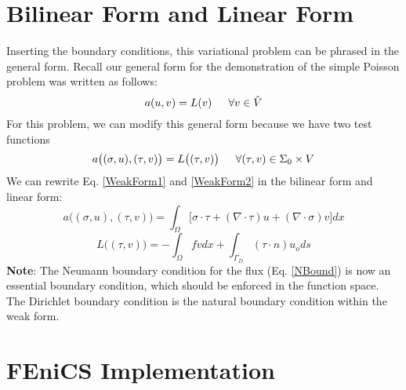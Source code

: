 \documentclass[12pt,3p]{article}
\begin{document}
\section{Bilinear Form and Linear Form}
Inserting the boundary conditions, this variational problem can be phrased in the general form. Recall our general form for the demonstration of the simple Poisson problem was written as follows: 
\begin{equation*}
a(u,v) = L(v)  \indent \forall v \in \hat{V}
\end{equation*}
For this problem, we can modify this general form because we have two test functions
\begin{equation*}
a\big((\sigma,u),(\tau, v) \big) = L\big((\tau, v) \big)  \indent \forall (\tau, v) \in \Sigma_0 \times V 
\end{equation*}
We can rewrite Eq. \ref{WeakForm1} and \ref{WeakForm2} in the bilinear form and linear form:
\begin{equation}\label{bilinear}
a\big((\sigma,u),(\tau, v) \big) = \int_{\Omega} \bigg[ \sigma \cdot \tau  + (\nabla \cdot \tau) u + (\nabla \cdot \sigma) v \bigg] dx
\end{equation}
\begin{equation}\label{linear}
L\big((\tau, v) \big) = - \int_{\Omega} fv dx +  \int_{\Gamma_D} (\tau \cdot n) u_o ds
\end{equation}
\textbf{Note}: The Neumann boundary condition for the flux (Eq. \ref{NBound}) is now an essential boundary condition, which should be enforced in the function space. The Dirichlet boundary condition is the natural boundary condition within the weak form.

\section{FEniCS Implementation}
\end{document}
